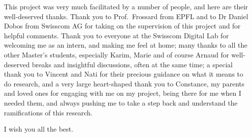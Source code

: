 \begin{acknowledgements}
    \addchaptertocentry{\acknowledgementname} %
This project was very much facilitated by a number of people, and here are their well-deserved thanks.
Thank you to Prof.~Frossard from EPFL and to Dr Daniel Dobos from Swisscom AG for taking on the supervision of this project and for helpful comments.
Thank you to everyone at the Swisscom Digital Lab for welcoming me as an intern, and making me feel at home;
many thanks to all the other Master's students, especially Karim, Marie and of course Arnaud for well-deserved breaks and insightful discussions, often at the same time;
a special thank you to Vincent and Nati for their precious guidance on what it means to do research, and
a very large heart-shaped thank you to Constance, my parents and loved ones for engaging with me on my project, being there for me when I needed them, and always pushing me to take a step back and understand the ramifications of this research.

I wish you all the best.
\end{acknowledgements}